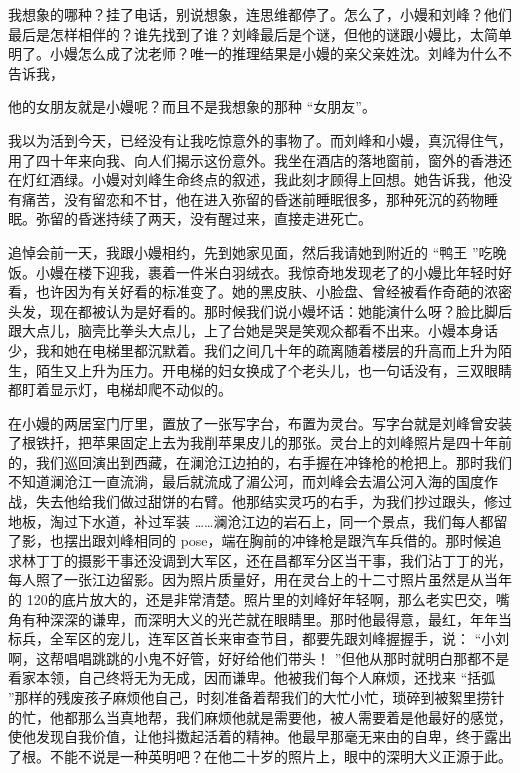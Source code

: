 \documentclass[12pt,twoside,openany]{book}
\begin{document}
我想象的哪种？挂了电话，别说想象，连思维都停了。怎么了，小嫚和刘峰？他们最后是怎样相伴的？谁先找到了谁？刘峰最后是个谜，但他的谜跟小嫚比，太简单明了。小嫚怎么成了沈老师？唯一的推理结果是小嫚的亲父亲姓沈。刘峰为什么不告诉我，

他的女朋友就是小嫚呢？而且不是我想象的那种 “女朋友”。

我以为活到今天，已经没有让我吃惊意外的事物了。而刘峰和小嫚，真沉得住气，用了四十年来向我、向人们揭示这份意外。我坐在酒店的落地窗前，窗外的香港还在灯红酒绿。小嫚对刘峰生命终点的叙述，我此刻才顾得上回想。她告诉我，他没有痛苦，没有留恋和不甘，他在进入弥留的昏迷前睡眠很多，那种死沉的药物睡眠。弥留的昏迷持续了两天，没有醒过来，直接走进死亡。

追悼会前一天，我跟小嫚相约，先到她家见面，然后我请她到附近的 “鸭王 ”吃晚饭。小嫚在楼下迎我，裹着一件米白羽绒衣。我惊奇地发现老了的小嫚比年轻时好看，也许因为有关好看的标准变了。她的黑皮肤、小脸盘、曾经被看作奇葩的浓密头发，现在都被认为是好看的。那时候我们说小嫚坏话：她能演什么呀？脸比脚后跟大点儿，脑壳比拳头大点儿，上了台她是哭是笑观众都看不出来。小嫚本身话少，我和她在电梯里都沉默着。我们之间几十年的疏离随着楼层的升高而上升为陌生，陌生又上升为压力。开电梯的妇女换成了个老头儿，也一句话没有，三双眼睛都盯着显示灯，电梯却爬不动似的。

在小嫚的两居室门厅里，置放了一张写字台，布置为灵台。写字台就是刘峰曾安装了根铁扦，把苹果固定上去为我削苹果皮儿的那张。灵台上的刘峰照片是四十年前的，我们巡回演出到西藏，在澜沧江边拍的，右手握在冲锋枪的枪把上。那时我们不知道澜沧江一直流淌，最后就流成了湄公河，而刘峰会去湄公河入海的国度作战，失去他给我们做过甜饼的右臂。他那结实灵巧的右手，为我们抄过跟头，修过地板，淘过下水道，补过军装 ……澜沧江边的岩石上，同一个景点，我们每人都留了影，也摆出跟刘峰相同的 pose，端在胸前的冲锋枪是跟汽车兵借的。那时候追求林丁丁的摄影干事还没调到大军区，还在昌都军分区当干事，我们沾丁丁的光，每人照了一张江边留影。因为照片质量好，用在灵台上的十二寸照片虽然是从当年的 120的底片放大的，还是非常清楚。照片里的刘峰好年轻啊，那么老实巴交，嘴角有种深深的谦卑，而深明大义的光芒就在眼睛里。那时他最得意，最红，年年当标兵，全军区的宠儿，连军区首长来审查节目，都要先跟刘峰握握手，说： “小刘啊，这帮唱唱跳跳的小鬼不好管，好好给他们带头！ ”但他从那时就明白那都不是看家本领，自己终将无为无成，因而谦卑。他被我们每个人麻烦，还找来 “括弧 ”那样的残废孩子麻烦他自己，时刻准备着帮我们的大忙小忙，琐碎到被絮里捞针的忙，他都那么当真地帮，我们麻烦他就是需要他，被人需要着是他最好的感觉，使他发现自我价值，让他抖擞起活着的精神。他最早那毫无来由的自卑，终于露出了根。不能不说是一种英明吧？在他二十岁的照片上，眼中的深明大义正源于此。
\end{document}
